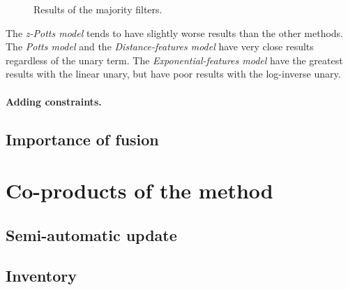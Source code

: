 \begin{figure}[htbp]
\begin{center}
{\label{subfig:C3_S3_ss4_priord}
}
\hspace*{0.025\textwidth}
\endgroup
\caption{Results of the majority filters.}
\label{fig:C3_S3_ss4_prior}
\end{center}
\end{figure}

The \textit{z-Potts model} tends to have slightly worse results than the other methods. The \textit{Potts model} and the \textit{Distance-features model} have very close results regardless of the unary term. The \textit{Exponential-features model} have the greatest results with the linear unary, but have poor results with the log-inverse unary.

\paragraph{Adding constraints. \\}

\subsection{Importance of fusion}

\section{Co-products of the method}
\subsection{Semi-automatic update}
\subsection{Inventory}




\stopcontents[chapters]